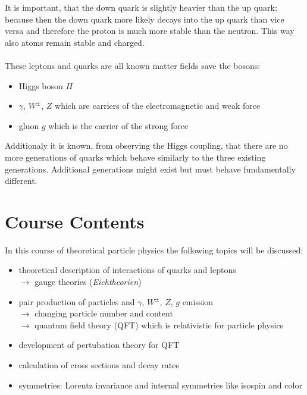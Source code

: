\documentclass{include/thesisclass}
\newcommand{\df}{\rightarrow}
\begin{document}
It is important, that the down quark is slightly heavier than the up quark; because then the down quark more likely decays into the up quark than vice versa and therefore the proton is much more stable than the neutron. This way also atoms remain stable and charged.\\
\\
These leptons and quarks are all known matter fields save the bosons:
\begin{itemize}
\item Higgs boson $H$
\item $\gamma$, $W^\pm$, $Z$ which are carriers of the electromagnetic and weak force
\item gluon $g$ which is the carrier of the strong force
\end{itemize}
Additionaly it is known, from observing the Higgs coupling, that there are no more generations of quarks which behave similarly to the three existing generations. Additional generations might exist but must behave fundamentally different.

\section{Course Contents}
In this course of theoretical particle physics the following topics will be discussed:
\begin{itemize}
\item theoretical description of interactions of quarks and leptons\\
$\df$ gauge theories (\textit{Eichtheorien})
\item pair production of particles and $\gamma$, $W^\pm$, $Z$, $g$ emission\\
$\df$ changing particle number and content\\
$\df$ quantum field theory (QFT) which is relativistic for particle physics
\item development of pertubation theory for QFT
\item calculation of cross sections and decay rates
\item symmetries: Lorentz invariance and internal symmetries like isospin and color
\end{itemize} 
\end{document}
